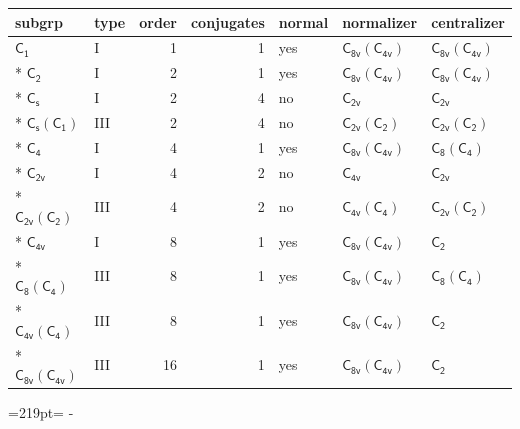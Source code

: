 \documentclass[10pt,a4paper]{article}
\newcommand{\needspace}[1]{\par\penalty-100\begingroup\dimen0=#1\relax\dimen2=\pagegoal
  \advance\dimen2-\pagetotal\ifdim\dimen0>\dimen2\relax\ifdim\dimen2>0pt\vfil\break\fi\fi
  \endgroup}
\numberwithin{equation}{section}
\newcommand{\grp}[1]{\mathsf{#1}}
\begin{document}
{\small\begin{longtable}{@{}llrrlll@{}}\toprule
subgrp & type & order & conjugates & normal & normalizer & centralizer\\\midrule\endhead
\bottomrule\endfoot\endlastfoot
\href{../../../rotation/data/pdf/C1.pdf}{$\grp{C_{1}}$} & I & 1 & 1 & yes & \href{C8v-C4v.pdf}{$\grp{C_{8v}}(\grp{C_{4v}})$} & \href{C8v-C4v.pdf}{$\grp{C_{8v}}(\grp{C_{4v}})$}\\*
\href{../../../rotation/data/pdf/C2.pdf}{$\grp{C_{2}}$} & I & 2 & 1 & yes & \href{C8v-C4v.pdf}{$\grp{C_{8v}}(\grp{C_{4v}})$} & \href{C8v-C4v.pdf}{$\grp{C_{8v}}(\grp{C_{4v}})$}\\*
\href{../../../rotation/data/pdf/C1v.pdf}{$\grp{C_{s}}$} & I & 2 & 4 & no & \href{../../../rotation/data/pdf/C2v.pdf}{$\grp{C_{2v}}$} & \href{../../../rotation/data/pdf/C2v.pdf}{$\grp{C_{2v}}$}\\*
\href{C1v-C1.pdf}{$\grp{C_{s}}(\grp{C_{1}})$} & III & 2 & 4 & no & \href{C2v-C2.pdf}{$\grp{C_{2v}}(\grp{C_{2}})$} & \href{C2v-C2.pdf}{$\grp{C_{2v}}(\grp{C_{2}})$}\\*
\href{../../../rotation/data/pdf/C4.pdf}{$\grp{C_{4}}$} & I & 4 & 1 & yes & \href{C8v-C4v.pdf}{$\grp{C_{8v}}(\grp{C_{4v}})$} & \href{C8-C4.pdf}{$\grp{C_{8}}(\grp{C_{4}})$}\\*
\href{../../../rotation/data/pdf/C2v.pdf}{$\grp{C_{2v}}$} & I & 4 & 2 & no & \href{../../../rotation/data/pdf/C4v.pdf}{$\grp{C_{4v}}$} & \href{../../../rotation/data/pdf/C2v.pdf}{$\grp{C_{2v}}$}\\*
\href{C2v-C2.pdf}{$\grp{C_{2v}}(\grp{C_{2}})$} & III & 4 & 2 & no & \href{C4v-C4.pdf}{$\grp{C_{4v}}(\grp{C_{4}})$} & \href{C2v-C2.pdf}{$\grp{C_{2v}}(\grp{C_{2}})$}\\*
\href{../../../rotation/data/pdf/C4v.pdf}{$\grp{C_{4v}}$} & I & 8 & 1 & yes & \href{C8v-C4v.pdf}{$\grp{C_{8v}}(\grp{C_{4v}})$} & \href{../../../rotation/data/pdf/C2.pdf}{$\grp{C_{2}}$}\\*
\href{C8-C4.pdf}{$\grp{C_{8}}(\grp{C_{4}})$} & III & 8 & 1 & yes & \href{C8v-C4v.pdf}{$\grp{C_{8v}}(\grp{C_{4v}})$} & \href{C8-C4.pdf}{$\grp{C_{8}}(\grp{C_{4}})$}\\*
\href{C4v-C4.pdf}{$\grp{C_{4v}}(\grp{C_{4}})$} & III & 8 & 1 & yes & \href{C8v-C4v.pdf}{$\grp{C_{8v}}(\grp{C_{4v}})$} & \href{../../../rotation/data/pdf/C2.pdf}{$\grp{C_{2}}$}\\*
\href{C8v-C4v.pdf}{$\grp{C_{8v}}(\grp{C_{4v}})$} & III & 16 & 1 & yes & \href{C8v-C4v.pdf}{$\grp{C_{8v}}(\grp{C_{4v}})$} & \href{../../../rotation/data/pdf/C2.pdf}{$\grp{C_{2}}$}\\
\bottomrule\end{longtable}}
\needspace{219pt}
\end{document}
